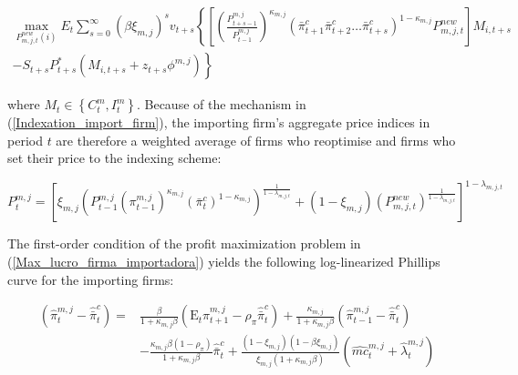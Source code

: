 \documentclass[12pt,oneside,a4paper]{article}
\begin{document}
\begin{equation}
\label{Max_lucro_firma_importadora}
    \begin{array}{c}
    \max _{P_{m, j, t}^{n e w}(i)} E_{t} \sum_{s=0}^{\infty}\left(\beta \xi_{m, j}\right)^{s} v_{t+s}\left\{\left[ \left(\frac{P_{t+s-1}^{m, j}}{P_{t-1}^{m, j}}\right)^{\kappa_{m, j}}\left(\bar{\pi}_{t+1}^{c} \bar{\pi}_{t+2}^{c} \ldots \bar{\pi}_{t+s}^{c}\right)^{1-\kappa_{m, j}} P_{m, j, t}^{n e w} \right] M_{i, t+s}\right. \\
    \left.-S_{t+s} P_{t+s}^{*}\left(M_{i, t+s}+z_{t+s} \phi^{m, j}\right)\right\}
    \end{array}
\end{equation}    

where $M_t \in \left\{C_t^{m},I_t^{m}\right\}$. Because of the mechanism in (\ref{Indexation_import_firm}), the importing firm's aggregate price indices in period $t$ are therefore a weighted average of firms who reoptimise and firms who set their price to the indexing scheme:

\begin{equation}
P_{t}^{m, j}=\left[\xi_{m, j}\left(P_{t-1}^{m, j}\left(\pi_{t-1}^{m, j}\right)^{\kappa_{m, j}}\left(\bar{\pi}_{t}^{c}\right)^{1-\kappa_{m, j}}\right)^{\frac{1}{1-\lambda_{m, j, t}}}+\left(1-\xi_{m, j}\right)\left(P_{m, j, t}^{n e w}\right)^{\frac{1}{1-\lambda_{m, j, t}}}\right]^{1-\lambda_{m, j, t}}
\end{equation}

The first-order condition of the profit maximization problem in (\ref{Max_lucro_firma_importadora}) yields the following log-linearized Phillips curve for the importing firms:

\begin{equation}
    \begin{aligned}
    \left(\widehat{\pi}_{t}^{m, j}-\widehat{\bar{\pi}}_{t}^{c}\right)=& \frac{\beta}{1+\kappa_{m, j} \beta}\left(\mathrm{E}_{t} \widehat{\pi}_{t+1}^{m, j}-\rho_{\pi} \widehat{\bar{\pi}}_{t}^{c}\right)+\frac{\kappa_{m, j}}{1+\kappa_{m, j} \beta}\left(\widehat{\pi}_{t-1}^{m, j}-\widehat{\bar{\pi}}_{t}^{c}\right) \\
    &-\frac{\kappa_{m, j} \beta\left(1-\rho_{\pi}\right)}{1+\kappa_{m, j} \beta} \widehat{\bar{\pi}}_{t}^{c}+\frac{\left(1-\xi_{m, j}\right)\left(1-\beta \xi_{m, j}\right)}{\xi_{m, j}\left(1+\kappa_{m, j} \beta\right)}\left(\widehat{m c}_{t}^{m, j}+\widehat{\lambda}_{t}^{m, j}\right)
    \end{aligned}
\end{equation}
\end{document}
